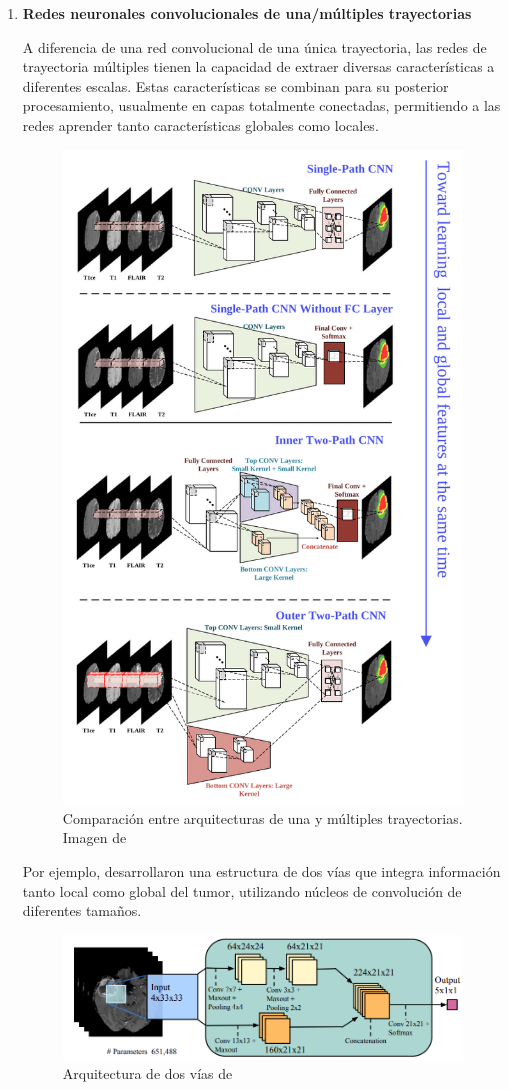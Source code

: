 			\begin{enumerate}
					
				\item \textbf{Redes neuronales convolucionales de una/múltiples trayectorias}
					
				A diferencia de una red convolucional de una única trayectoria, las redes de trayectoria múltiples tienen la capacidad de extraer diversas características a diferentes escalas. Estas características se combinan para su posterior procesamiento, usualmente en capas totalmente conectadas, permitiendo a las redes aprender tanto características globales como locales. 
				
				\begin{figure}[H]
					\centering
					\includegraphics[width=0.5\linewidth]{imagenes/comparisonsinglemultipleCNN.png}
					\caption{Comparación entre arquitecturas de una y múltiples trayectorias. Imagen de \cite{liu2023deep}}
				\end{figure}
				
				Por ejemplo, \cite{havaei2017brain} desarrollaron una estructura de dos vías que integra información tanto local como global del tumor, utilizando núcleos de convolución de diferentes tamaños.
				
				\begin{figure}[H]
					\centering
					\includegraphics[width=0.75\linewidth]{imagenes/havaei2017architecture.png}
					\caption{Arquitectura de dos vías de \cite{havaei2017brain}}
				\end{figure}


\end{enumerate}
